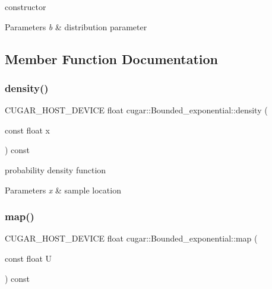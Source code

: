 constructor


\begin{DoxyParams}{Parameters}
{\em b} & distribution parameter \\
\hline
\end{DoxyParams}


\subsection{Member Function Documentation}
\mbox{\label{structcugar_1_1_bounded__exponential_a9beb28b31e411c401184fd1017fd0189}} 
\subsubsection{\texorpdfstring{density()}{density()}}
{\footnotesize\ttfamily C\+U\+G\+A\+R\+\_\+\+H\+O\+S\+T\+\_\+\+D\+E\+V\+I\+CE float cugar\+::\+Bounded\+\_\+exponential\+::density (\begin{DoxyParamCaption}\item[{const float}]{x }\end{DoxyParamCaption}) const\hspace{0.3cm}{\ttfamily [inline]}}

probability density function


\begin{DoxyParams}{Parameters}
{\em x} & sample location \\
\hline
\end{DoxyParams}
\mbox{\label{structcugar_1_1_bounded__exponential_a0678c62a51ca6b329d70ffdebf676c94}} 
\subsubsection{\texorpdfstring{map()}{map()}}
{\footnotesize\ttfamily C\+U\+G\+A\+R\+\_\+\+H\+O\+S\+T\+\_\+\+D\+E\+V\+I\+CE float cugar\+::\+Bounded\+\_\+exponential\+::map (\begin{DoxyParamCaption}\item[{const float}]{U }\end{DoxyParamCaption}) const\hspace{0.3cm}{\ttfamily [inline]}}

